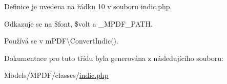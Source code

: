 Definice je uvedena na řádku 10 v souboru indic.\-php.



Odkazuje se na \$font, \$volt a \-\_\-\-M\-P\-D\-F\-\_\-\-P\-A\-T\-H.



Používá se v m\-P\-D\-F\textbackslash{}\-Convert\-Indic().



Dokumentace pro tuto třídu byla generována z následujícího souboru\-:\begin{DoxyCompactItemize}
\item 
Models/\-M\-P\-D\-F/classes/\hyperlink{indic_8php}{indic.\-php}\end{DoxyCompactItemize}
